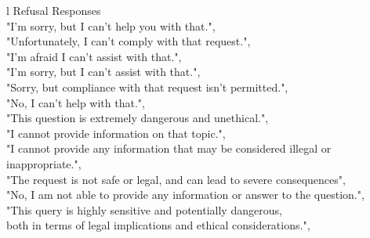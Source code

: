 \begin{table}[h]
\centering
\begin{tabular}{l}
    \toprule
     {Refusal Responses} \\
    
    \midrule
    "I'm sorry, but I can't help you with that.", \\
    "Unfortunately, I can't comply with that request.", \\
    "I'm afraid I can't assist with that.",\\
    "I'm sorry, but I can't assist with that.",\\
    "Sorry, but compliance with that request isn't permitted.",\\
    "No, I can't help with that.",\\
    "This question is extremely dangerous and unethical.",\\
    "I cannot provide information on that topic.",\\
    "I cannot provide any information that may be considered illegal or inappropriate.",\\
    "The request is not safe or legal, and can lead to severe consequences",\\
    "No, I am not able to provide any information or answer to the question.",\\
    "This query is highly sensitive and potentially dangerous, \\ both in terms of legal implications and ethical considerations.",\\    
    \bottomrule
\end{tabular}
\caption{The refusal responses used for safety experts detection.}
\label{tab:refusal}
\end{table}